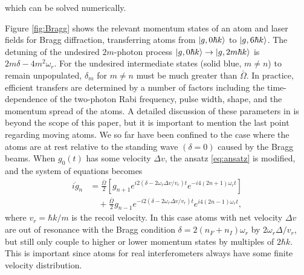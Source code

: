 \documentclass[reprint,
nofootinbib,
amsmath,amssymb,
aps]{revtex4-1}
\newcommand{\f}[2]{\frac{#1}{#2}}
\newcommand{\lb}{\left[}
\newcommand{\rb}{\right]}
\begin{document}
which can be solved numerically. 



Figure \ref{fig:Bragg} shows the relevant momentum states of an atom and laser fields for Bragg diffraction, transferring atoms from $\ket{g,0\hbar k}$ to $\ket{g,6\hbar k}$. The detuning of the undesired $2m$-photon process $\ket{g,0\hbar k} \to \ket{g,2m\hbar k}$ is $2m\delta - 4m^2 \omega_r$. For the undesired intermediate states (solid blue, $m\neq n$) to remain unpopulated, $\delta_m$ for $m\neq n$ must be much greater than $\bar{\Omega}$. In practice, efficient transfers are determined by a number of factors including the time-dependence of the two-photon Rabi frequency, pulse width, shape, and the momentum spread of the atoms. A detailed discussion of these parameters in \cite{estey2016precision} is beyond the scope of this paper, but it is important to mention the last point regarding moving atoms. We so far have been confined to the case where the atoms are at rest relative to the standing wave $(\delta = 0)$ caused by the Bragg beams. When $g_0(t)$ has some velocity $\Delta v$, the ansatz \eqref{eq:ansatz} is modified, and the system of equations becomes
\begin{align*}
i\dot{g}_n &= \f{\bar{\Omega}}{2}\lb g_{n+1} e^{i2(\delta - 2\omega_r \Delta v/v_r)t} e^{-i4(2n+1)\omega_r t} \rb \\ 
& \quad + \f{\bar{\Omega}}{2}g_{n-1} e^{-i2(\delta - 2\omega_r \Delta v/v_r) t} e^{i4(2n-1)\omega_r t} ,
\end{align*}
where $v_r = \hbar k/m$ is the recoil velocity. In this case atoms with net velocity $\Delta v$ are out of resonance with the Bragg condition $\delta = 2(n_F + n_I)\omega_r$ by $2\omega_r \Delta / v_r$, but still only couple to higher or lower momentum states by multiples of $2\hbar k$. This is important since atoms for real interferometers always have some finite velocity distribution. 
\end{document}
